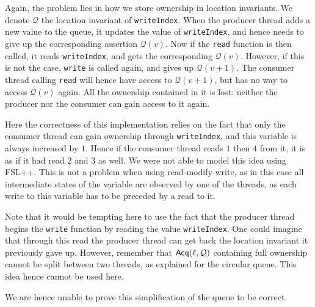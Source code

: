 Again, the problem lies in how we store ownership in location invariants. We denote $\mathcal{Q}$ the location invariant of \texttt{writeIndex}. When the producer thread adds a new value to the queue, it updates the value of \texttt{writeIndex}, and hence needs to give up the corresponding assertion $\mathcal{Q}(v)$. Now if the \texttt{read} function is then called, it reads \texttt{writeIndex}, and gets the corresponding $\mathcal{Q}(v)$. However, if this is not the case, \texttt{write} is called again, and gives up $\mathcal{Q}(v + 1)$. The consumer thread calling \texttt{read} will hence have access to $\mathcal{Q}(v + 1)$, but has no way to access $\mathcal{Q}(v)$ again. All the ownership contained in it is lost: neither the producer nor the consumer can gain access to it again.

Here the correctness of this implementation relies on the fact that only the consumer thread can gain ownership through \texttt{writeIndex}, and this variable is always increased by $1$. Hence if the consumer thread reads $1$ then $4$ from it, it is as if it had read $2$ and $3$ as well. We were not able to model this idea using FSL++. This is not a problem when using read-modify-write, as in this case all intermediate states of the variable are observed by one of the threads, as each write to this variable has to be preceded by a read to it.

Note that it would be tempting here to use the fact that the producer thread begins the \texttt{write} function by reading the value \texttt{writeIndex}. One could imagine that through this read the producer thread can get back the location invariant it previously gave up. However, remember that $\operatorname{\mathsf{Acq}}(\ell, \mathcal{Q})$ containing full ownership cannot be split between two threads, as explained for the circular queue. This idea hence cannot be used here.

We are hence unable to prove this simplification of the queue to be correct. 
